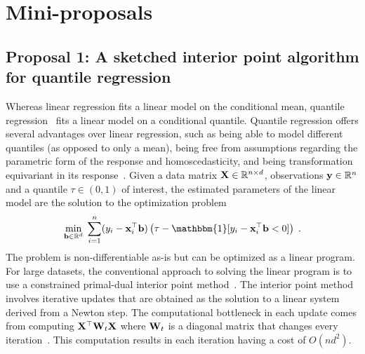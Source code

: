 

\section{Mini-proposals}

\subsection[A sketched interior point algorithm for quantile regression]{Proposal 1: A sketched interior point algorithm for quantile regression} %

Whereas linear regression fits a linear model on the conditional mean, quantile regression~\citep{Koenker:1978} fits a linear model on a conditional quantile. Quantile regression offers several advantages over linear regression, such as being able to model different quantiles (as opposed to only a mean), being free from assumptions regarding the parametric form of the response and homoscedasticity, and being transformation equivariant in its response~\citep{Rodriguez:2017}. Given a data matrix $\mathbf{X}\in\mathbb{R}^{n\times d}$, observations $\mathbf{y}\in\mathbb{R}^{n}$ and a quantile $\tau\in(0,1)$ of interest, the estimated parameters of the linear model are the solution to the optimization problem
\[
\min_{\bfb\in\bbR^d} \; \sum_{i=1}^n(y_i-\bfx_i^\T\bfb)\left(\tau - \mathbbm{1}[y_i-\bfx_i^\top\bfb < 0]\right) \;.
\]
The problem is non-differentiable as-is but can be optimized as a linear program. For large datasets, the conventional approach to solving the linear program is to use a constrained primal-dual interior point method~\citep{Portnoy:1997}. The interior point method involves iterative updates that are obtained as the solution to a linear system derived from a Newton step. The computational bottleneck in each update comes from  computing $\mathbf{X}^\top\mathbf{W}_t\mathbf{X}$ where $\mathbf{W}_t$ is a diagonal matrix that changes every iteration~\citep{Chen:2005}. This computation results in each iteration having a cost of $O(nd^2)$.
\\

